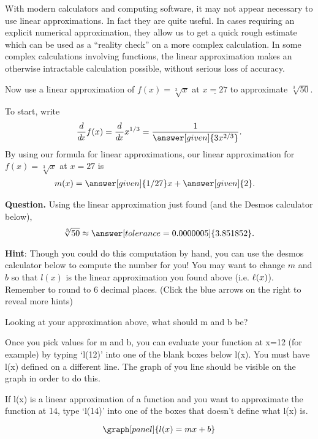 \documentclass[handout,nooutcomes]{ximera}
\begin{document}
With modern calculators and computing software, it may not appear
necessary to use linear approximations. In fact they are quite
useful. In cases requiring an explicit numerical approximation, they
allow us to get a quick rough estimate which can be used as a
``reality check'' on a more complex calculation. In some complex
calculations involving functions, the linear approximation makes an
otherwise intractable calculation possible, without serious loss of
accuracy.



\begin{example}
Now use a linear approximation of $f(x) =\sqrt[3]{x}$ at $\underline{x=27}$ to
approximate $\sqrt[3]{50}$.
\begin{explanation}
To start, write
\[
\ddx f(x) = \ddx x^{1/3} = \frac{1}{\answer[given]{3x^{2/3}}}.
\]
By using our formula for linear approximations, our linear 
approximation for $f(x)=\sqrt[3]{x}$ at $x=27$ is
\begin{align*}
m(x) &= \answer[given]{1/27}x + \answer[given]{2}.
\end{align*}


\textbf{Question. } Using the linear approximation just found (and the Desmos calculator below),
\[
\sqrt[3]{50} \approx \answer[tolerance=0.0000005]{3.851852}.
\]


\bigskip
\textbf{Hint}: Though you could do this computation by hand, you can use
the desmos calculator below to compute the number for you! You may want
to change $m$ and $b$ so that $l(x)$ is the linear approximation you
found above (i.e. $\ell(x)$). Remember to round to 6 decimal places.
(Click the blue arrows on the right to reveal more hints)

\begin{expandable}
Looking at your approximation above, what should m and b be?
\end{expandable}
\begin{expandable}
Once you pick values for m and b, you can evaluate your function
at x=12 (for example) by typing `l(12)' into one of the blank boxes below l(x).
You must have l(x) defined on a different line. The graph of you line
should be visible on the graph in order to do this.
\end{expandable}
\begin{expandable}
If l(x) is a linear approximation of a function and you want to approximate
the function at 14, type `l(14)' into one of the boxes that doesn't define what l(x) is.
\end{expandable}
\[
\graph[panel]{l(x) = mx+b}
\]


\end{explanation}
\end{example}
\end{document}
